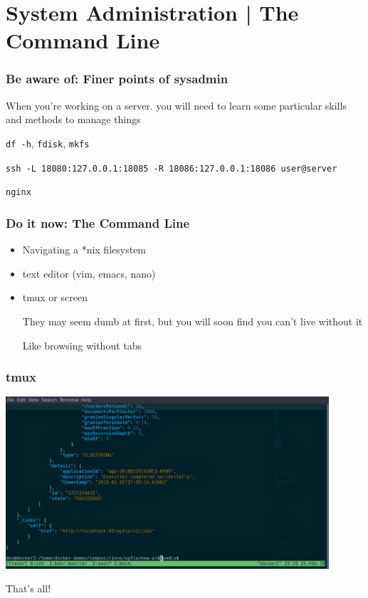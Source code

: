 \documentclass[10pt]{beamer}
\begin{document}
\section{System Administration | The Command Line}


\begin{frame}[c]
	\frametitle{Be aware of: Finer points of sysadmin}
	\pause
	When you're working on a server. you will need to learn some particular skills and methods to manage things

	\begin{description}[<+->]
		\item[Managing volumes] \texttt{df -h}, \texttt{fdisk}, \texttt{mkfs}
		\item[ssh tunnels and UDP] \texttt{ssh -L 18080:127.0.0.1:18085 -R 18086:127.0.0.1:18086 user@server}
		\item[web access control]  \texttt{nginx}
	\end{description}
\end{frame}


\begin{frame}[c]
	\frametitle{Do it now: The Command Line}
	\begin{itemize}[<+->]
		\item Navigating a *nix filesystem
		\item text editor (vim, emacs, nano)
		\item tmux or screen

		They may seem dumb at first, but you will soon find you can't live without it

		Like browsing without tabs
	\end{itemize}
\end{frame}

\begin{frame}[c]
	\frametitle{tmux}

	\centerline{\includegraphics[width=12cm]{tmux.png}}
\end{frame}









\begin{frame}[standout]
  That's all!
\end{frame}
\end{document}

